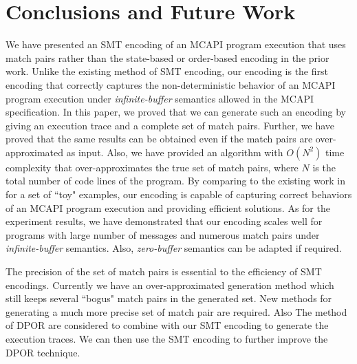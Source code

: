 \section{Conclusions and Future Work}
We have presented an SMT encoding of an MCAPI program execution that uses match pairs rather than the state-based or order-based encoding in the prior work. Unlike the existing method of SMT encoding, our encoding is the first encoding that correctly captures the non-deterministic behavior of an MCAPI program execution under \textit{infinite-buffer} semantics allowed in the MCAPI specification. In this paper, we proved that we can generate such an encoding by giving an execution trace and a complete set of match pairs. Further, we have proved that the same results can be obtained even if the match pairs are over-approximated as input. Also, we have provided an algorithm with $O(N^2)$ time complexity that over-approximates the true set of match pairs, where $N$ is the total number of code lines of the program. By comparing to the existing work in \cite{elwakil:padtad10} for a set of ``toy" examples, our encoding is capable of capturing correct behaviors of an MCAPI program execution and providing efficient solutions. As for the experiment results, we have demonstrated that our encoding scales well for programs with large number of messages and numerous match pairs under \textit{infinite-buffer} semantics. Also, \textit{zero-buffer} semantics can be adapted if required.

The precision of the set of match pairs is essential to the efficiency of SMT encodings. Currently we have an over-approximated generation method which still keeps several ``bogus" match pairs in the generated set. New methods for generating a much more precise set of match pair are required. Also The method of DPOR are considered to combine with our SMT encoding to generate the execution traces. We can then use the SMT encoding to further improve the DPOR technique.

